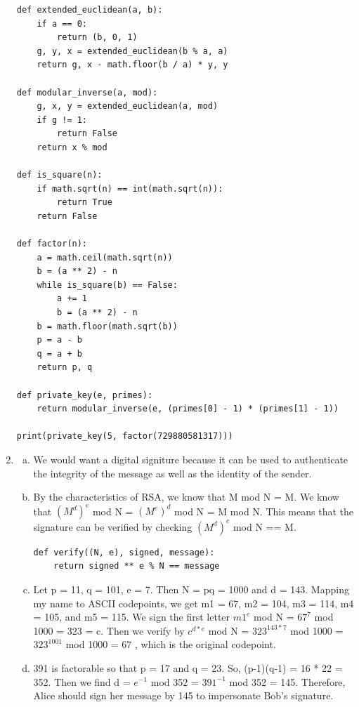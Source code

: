 \documentclass{article}
\begin{document}
\begin{enumerate}
\begin{lstlisting}
def extended_euclidean(a, b):
    if a == 0:
        return (b, 0, 1)
    g, y, x = extended_euclidean(b % a, a)
    return g, x - math.floor(b / a) * y, y

def modular_inverse(a, mod):
    g, x, y = extended_euclidean(a, mod)
    if g != 1:
        return False
    return x % mod

def is_square(n):
    if math.sqrt(n) == int(math.sqrt(n)):
        return True
    return False

def factor(n):
    a = math.ceil(math.sqrt(n))
    b = (a ** 2) - n
    while is_square(b) == False:
        a += 1
        b = (a ** 2) - n
    b = math.floor(math.sqrt(b))
    p = a - b
    q = a + b
    return p, q

def private_key(e, primes):
    return modular_inverse(e, (primes[0] - 1) * (primes[1] - 1))

print(private_key(5, factor(729880581317)))
	\end{lstlisting}
    \clearpage

	\item \begin{enumerate}[(a)]
		\item We would want a digital signiture because it can be used to authenticate the integrity of the message as well as the identity of the sender.
		\item By the characteristics of RSA, we know that M mod N = M. We know that $(M^{d})^{e}$ mod N = $(M^{e})^{d}$ mod N = M mod N. This means that the signature can
		be verified by checking $(M^{d})^{e}$ mod N == M.
		\begin{lstlisting}
def verify((N, e), signed, message):
	return signed ** e % N == message
		\end{lstlisting}
		\item Let p = 11, q = 101, e = 7. Then N = pq = 1000 and d = 143. Mapping my name to ASCII codepoints, we get m1 = 67, m2 = 104, m3 = 114, m4 = 105, and m5 = 115.
		We sign the first letter $m1^{e}$ mod N = $67^{7}$ mod 1000 = 323 = c. Then we verify by $c^{d * e}$ mod N = $323^{143 * 7}$ mod 1000 = $323^{1001}$ mod 1000 = 67 , which is the original codepoint.
		\item 391 is factorable so that p = 17 and q = 23. So, (p-1)(q-1) = 16 * 22 = 352. Then we find d = $e^{-1}$ mod 352 = $391^{-1}$ mod 352 = 145.
		Therefore, Alice should sign her message by 145 to impersonate Bob's signature.  
	\end{enumerate}


\end{enumerate}
\end{document}
